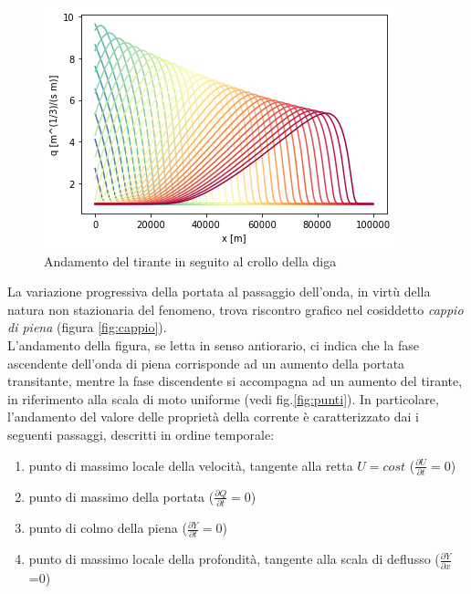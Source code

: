\documentclass[12pt]{article} %
\begin{document}
\begin{figure} [H]
    \centering
    \includegraphics{Onda.png}
    \caption{Andamento del tirante in seguito al crollo della diga}
    \label{fig:onda}
\end{figure}

\noindent La variazione progressiva della portata al passaggio dell'onda, in virtù della natura non stazionaria del fenomeno, trova riscontro grafico nel cosiddetto \textit{cappio di piena} (figura \ref{fig:cappio}). \\ L'andamento della figura, se letta in senso antiorario, ci indica che la fase ascendente dell'onda di piena corrisponde ad un aumento della portata transitante, mentre la fase discendente si accompagna ad un aumento del tirante, in riferimento alla scala di moto uniforme (vedi fig.\ref{fig:punti}). In particolare, l'andamento del valore delle proprietà della corrente è caratterizzato dai i seguenti passaggi, descritti in ordine temporale:
\begin{enumerate}
    \item punto di massimo locale della velocità, tangente alla retta $U=cost$ ($\frac{\partial U}{\partial t}=0$)
    \item punto di massimo della portata ($\frac{\partial Q}{\partial t}=0$)
    \item punto di colmo della piena ($\frac{\partial Y}{\partial t}=0$)
    \item punto di massimo locale della profondità, tangente alla scala di deflusso ($\frac{\partial Y}{\partial x}$=0)
\end{enumerate}
\end{document}

